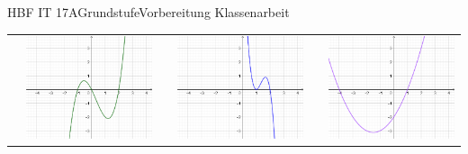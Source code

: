 \documentclass[oneside,openany,headings=optiontotoc,11pt,numbers=noenddot]{scrreprt}
\begin{document}
\begin{worksheet}{HBF IT 17A}{Grundstufe}{Vorbereitung Klassenarbeit}
\begin{framed}
\begin{tabularx}{\textwidth}{|cX|cX|cX|}
				& \includegraphics[scale=0.2]{Bilder/fue.png} & & \includegraphics[scale=0.2]{Bilder/gue.png} & & \includegraphics[scale=0.2]{Bilder/hue.png}\\

\end{tabularx}
\end{framed}
\end{worksheet}
\end{document}
